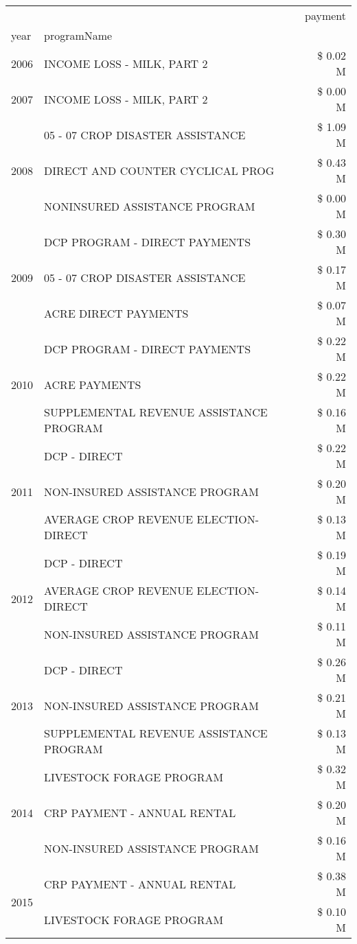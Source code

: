 \begin{tabular}{llr}
\toprule
 &  & payment \\
year & programName &  \\
\midrule
2006 & INCOME LOSS - MILK, PART 2 & \$ 0.02 M \\
\cline{1-3}
2007 & INCOME LOSS - MILK, PART 2 & \$ 0.00 M \\
\cline{1-3}
\multirow[t]{3}{*}{2008} & 05 - 07 CROP DISASTER ASSISTANCE & \$ 1.09 M \\
 & DIRECT AND COUNTER CYCLICAL PROG & \$ 0.43 M \\
 & NONINSURED ASSISTANCE PROGRAM & \$ 0.00 M \\
\cline{1-3}
\multirow[t]{3}{*}{2009} & DCP PROGRAM - DIRECT PAYMENTS & \$ 0.30 M \\
 & 05 - 07 CROP DISASTER ASSISTANCE & \$ 0.17 M \\
 & ACRE DIRECT PAYMENTS & \$ 0.07 M \\
\cline{1-3}
\multirow[t]{3}{*}{2010} & DCP PROGRAM - DIRECT PAYMENTS & \$ 0.22 M \\
 & ACRE PAYMENTS & \$ 0.22 M \\
 & SUPPLEMENTAL REVENUE ASSISTANCE PROGRAM & \$ 0.16 M \\
\cline{1-3}
\multirow[t]{3}{*}{2011} & DCP - DIRECT & \$ 0.22 M \\
 & NON-INSURED ASSISTANCE PROGRAM & \$ 0.20 M \\
 & AVERAGE CROP REVENUE ELECTION-DIRECT & \$ 0.13 M \\
\cline{1-3}
\multirow[t]{3}{*}{2012} & DCP - DIRECT & \$ 0.19 M \\
 & AVERAGE CROP REVENUE ELECTION-DIRECT & \$ 0.14 M \\
 & NON-INSURED ASSISTANCE PROGRAM & \$ 0.11 M \\
\cline{1-3}
\multirow[t]{3}{*}{2013} & DCP - DIRECT & \$ 0.26 M \\
 & NON-INSURED ASSISTANCE PROGRAM & \$ 0.21 M \\
 & SUPPLEMENTAL REVENUE ASSISTANCE PROGRAM & \$ 0.13 M \\
\cline{1-3}
\multirow[t]{3}{*}{2014} & LIVESTOCK FORAGE PROGRAM & \$ 0.32 M \\
 & CRP PAYMENT - ANNUAL RENTAL & \$ 0.20 M \\
 & NON-INSURED ASSISTANCE PROGRAM & \$ 0.16 M \\
\cline{1-3}
\multirow[t]{3}{*}{2015} & CRP PAYMENT - ANNUAL RENTAL & \$ 0.38 M \\
 & LIVESTOCK FORAGE PROGRAM & \$ 0.10 M \\

\end{tabular}
